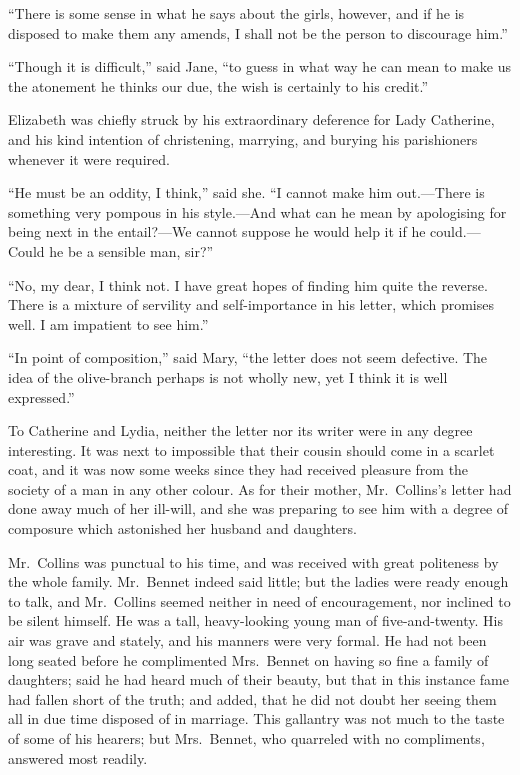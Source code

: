 \documentclass[12pt,english]{book}
\begin{document}
{}``There is some sense in what he says about the girls, however,
and if he is disposed to make them any amends, I shall not be the
person to discourage him.''

{}``Though it is difficult,'' said Jane, {}``to guess in what way
he can mean to make us the atonement he thinks our due, the wish is
certainly to his credit.''

Elizabeth was chiefly struck by his extraordinary deference for Lady
Catherine, and his kind intention of christening, marrying, and burying
his parishioners whenever it were required.

{}``He must be an oddity, I think,'' said she. {}``I cannot make
him out.\mbox{---}There is something very pompous in his style.\mbox{---}And
what can he mean by apologising for being next in the entail?\mbox{---}We
cannot suppose he would help it if he could.\mbox{---}Could he be
a sensible man, sir?''\ 

{}``No, my dear, I think not. I have great hopes of finding him quite
the reverse. There is a mixture of servility and self-importance in
his letter, which promises well. I am impatient to see him.''

{}``In point of composition,'' said Mary, {}``the letter does not
seem defective. The idea of the olive-branch perhaps is not wholly
new, yet I think it is well expressed.''

To Catherine and Lydia, neither the letter nor its writer were in
any degree interesting. It was next to impossible that their cousin
should come in a scarlet coat, and it was now some weeks since they
had received pleasure from the society of a man in any other colour.
As for their mother, Mr.\ Collins's letter had done away much of
her ill-will, and she was preparing to see him with a degree of composure
which astonished her husband and daughters.

Mr.\ Collins was punctual to his time, and was received with great
politeness by the whole family. Mr.\ Bennet indeed said little; but
the ladies were ready enough to talk, and Mr.\ Collins seemed neither
in need of encouragement, nor inclined to be silent himself. He was
a tall, heavy-looking young man of five-and-twenty. His air was grave
and stately, and his manners were very formal. He had not been long
seated before he complimented Mrs.\ Bennet on having so fine a family
of daughters; said he had heard much of their beauty, but that in
this instance fame had fallen short of the truth; and added, that
he did not doubt her seeing them all in due time disposed of in marriage.
This gallantry was not much to the taste of some of his hearers; but
Mrs.\ Bennet, who quarreled with no compliments, answered most readily.
\end{document}
